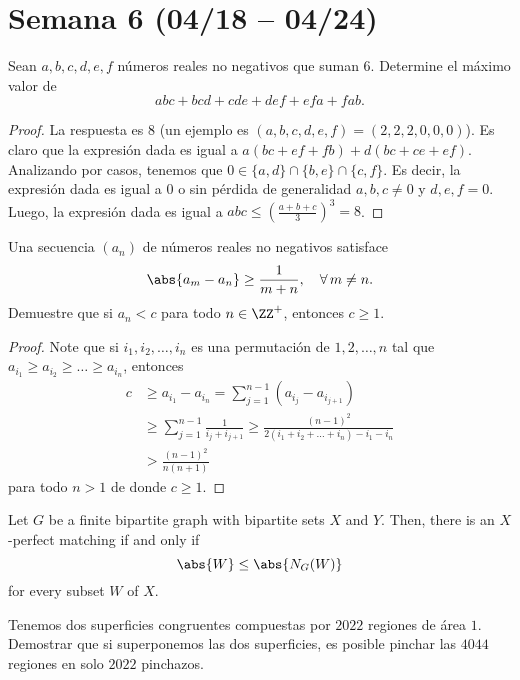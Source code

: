 \section{Semana 6 (04/18 -- 04/24)}

\begin{probEG}
	Sean $a,b,c,d,e,f$ números reales no negativos que suman $6$. Determine el máximo valor de
	\[abc+bcd+cde+def+efa+fab.\]
\end{probEG}

\begin{proof}
	La respuesta es $8$ (un ejemplo es $(a,b,c,d,e,f)=(2,2,2,0,0,0)$). Es claro que la expresión dada es igual a $a(bc+ef+fb)+d(bc+ce+ef)$. Analizando por casos, tenemos que $0\in\{a,d\}\cap\{b,e\}\cap\{c,f\}$. Es decir, la expresión dada es igual a $0$ o sin pérdida de generalidad $a,b,c\ne 0$ y $d,e,f=0$. Luego, la expresión dada es igual a $abc\le\left(\frac{a+b+c}{3}\right)^3=8$.
\end{proof}

\begin{probMR}
	Una secuencia $(a_n)$ de números reales no negativos satisface
	\[\abs{a_m-a_n}\ge\frac{1}{m+n},\quad\forall\,m\ne n.\]
	Demuestre que si $a_n<c$ para todo $n\in\ZZ^+$, entonces $c\ge 1$.
\end{probMR}

\begin{proof}
	Note que si $i_1,i_2,\dots,i_n$ es una permutación de $1,2,\dots,n$ tal que $a_{i_1}\ge a_{i_2}\ge\dots\ge a_{i_n}$, entonces
	\begin{align*}
		c&\ge a_{i_1}-a_{i_n}
		=\sum_{j=1}^{n-1}(a_{i_j}-a_{i_{j+1}})\\
		&\ge\sum_{j=1}^{n-1}\frac{1}{i_j+i_{j+1}}
		\ge\frac{(n-1)^2}{2(i_1+i_2+\dots+i_n)-i_1-i_n}\\
		&>\frac{(n-1)^2}{n(n+1)}
	\end{align*}
	para todo $n>1$ de donde $c\ge 1$.
\end{proof}

\begin{theorem}
	Let $G$ be a finite bipartite graph with bipartite sets $X$ and $Y$. Then, there is an $X$-perfect matching if and only if
	\[\abs{W}\le\abs{N_G(W)}\]
	for every subset $W$ of $X$.
\end{theorem}

\begin{probEG}
	Tenemos dos superficies congruentes compuestas por $2022$ regiones de área $1$. Demostrar que si superponemos las dos superficies, es posible pinchar las $4044$ regiones en solo $2022$ pinchazos.
\end{probEG}

